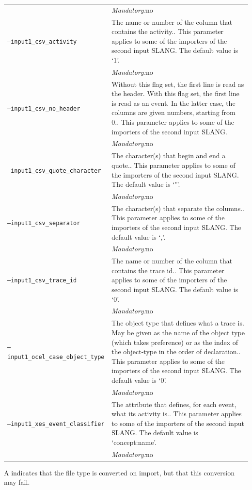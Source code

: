 {\begin{tabularx}{\linewidth}{lX}
&\textit{Mandatory:}\quad no\\
\texttt{--input1\_csv\_activity} & The name or number of the column that contains the activity.. This parameter applies to some of the importers of the second input SLANG. The default value is `1'.\\
&\textit{Mandatory:}\quad no\\
\texttt{--input1\_csv\_no\_header} & Without this flag set, the first line is read as the header. 
    With this flag set, the first line is read as an event. In the latter case, the columns are given numbers, starting from 0.. This parameter applies to some of the importers of the second input SLANG. \\
&\textit{Mandatory:}\quad no\\
\texttt{--input1\_csv\_quote\_character} & The character(s) that begin and end a quote.. This parameter applies to some of the importers of the second input SLANG. The default value is `"'.\\
&\textit{Mandatory:}\quad no\\
\texttt{--input1\_csv\_separator} & The character(s) that separate the columns.. This parameter applies to some of the importers of the second input SLANG. The default value is `,'.\\
&\textit{Mandatory:}\quad no\\
\texttt{--input1\_csv\_trace\_id} & The name or number of the column that contains the trace id.. This parameter applies to some of the importers of the second input SLANG. The default value is `0'.\\
&\textit{Mandatory:}\quad no\\
\texttt{--input1\_ocel\_case\_object\_type} & The object type that defines what a trace is. May be given as the name of the object type (which takes preference) or as the index of the object-type in the order of declaration.. This parameter applies to some of the importers of the second input SLANG. The default value is `0'.\\
&\textit{Mandatory:}\quad no\\
\texttt{--input1\_xes\_event\_classifier} & The attribute that defines, for each event, what its activity is.. This parameter applies to some of the importers of the second input SLANG. The default value is `concept:name'.\\
&\textit{Mandatory:}\quad no\\
\bottomrule
\end{tabularx}
A \textdagger{} indicates that the file type is converted on import, but that this conversion may fail.
}
